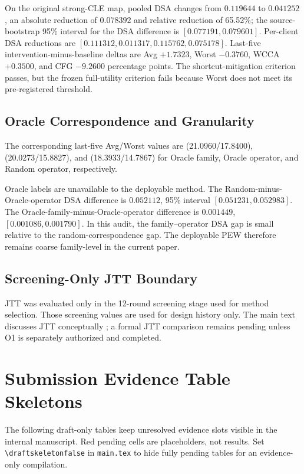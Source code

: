 On the original strong-CLE map, pooled DSA changes from \(0.119644\) to \(0.041252\), an absolute reduction of \(0.078392\) and relative reduction of 65.52\%; the source-bootstrap 95\% interval for the DSA difference is \([0.077191,0.079601]\). Per-client DSA reductions are \([0.111312,0.011317,0.115762,0.075178]\). Last-five intervention-minus-baseline deltas are Avg \(+1.7323\), Worst \(-0.3760\), WCCA \(+0.3500\), and CFG \(-9.2600\) percentage points. The shortcut-mitigation criterion passes, but the frozen full-utility criterion fails because Worst does not meet its pre-registered threshold.

\subsection{Oracle Correspondence and Granularity}



The corresponding last-five Avg/Worst values are (21.0960/17.8400),
(20.0273/15.8827), and (18.3933/14.7867) for Oracle family, Oracle
operator, and Random operator, respectively.

Oracle labels are unavailable to the deployable method. The Random-minus-Oracle-operator DSA difference is \(0.052112\), 95\% interval \([0.051231,0.052983]\). The Oracle-family-minus-Oracle-operator difference is \(0.001449\), \([0.001086,0.001790]\). In this audit, the family--operator DSA gap is small relative to the random-correspondence gap. The deployable PEW therefore remains coarse family-level in the current paper.

\subsection{Screening-Only JTT Boundary}

JTT was evaluated only in the 12-round screening stage used for method selection. Those screening values are used for design history only. The main text discusses JTT conceptually \citep{liu2021jtt}; a formal JTT comparison remains pending unless O1 is separately authorized and completed.

\section{Submission Evidence Table Skeletons}

The following draft-only tables keep unresolved evidence slots visible in the internal manuscript. Red pending cells are placeholders, not results. Set \verb|\draftskeletonfalse| in \verb|main.tex| to hide fully pending tables for an evidence-only compilation.

